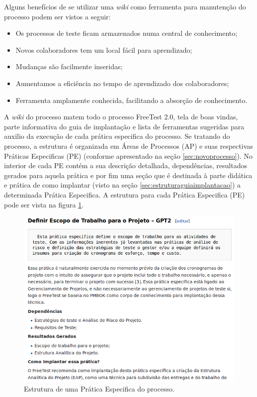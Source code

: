 Alguns benefícios de se utilizar uma \textit{wiki} como ferramenta para manutenção do processo podem ser vistos a seguir:

\begin{itemize}
	\item Os processos de teste ficam armazenados numa central de conhecimento;
    \item Novos colaboradores tem um local fácil para aprendizado;
    \item Mudanças são facilmente inseridas;
    \item Aumentamos a eficiência no tempo de aprendizado dos colaboradores;
    \item Ferramenta amplamente conhecida, facilitando a absorção de conhecimento.
\end{itemize}

A \textit{wiki} do processo matem todo o processo FreeTest 2.0, tela de boas vindas, parte informativa do guia de implantação e lista de ferramentas sugeridas para auxilio da execução de cada prática especifica do processo. Se tratando do processo, a estrutura é organizada em Áreas de Processos (AP) e suas respectivas Práticas Especificas (PE) (conforme apresentado na seção \ref{sec:novoprocesso}). No interior de cada PE contém a sua descrição detalhada, dependências, resultados gerados para aquela prática e por fim uma seção que é destinada à parte didática e prática de como implantar (visto na seção \ref{sec:estruturaguiaimplantacao}) a determinada Prática Especifica. A estrutura para cada Prática Especifica (PE) pode ser vista na figura \ref{fig:fig64}.

\begin{figure}[H]
\centering
\includegraphics[width=.90\textwidth]{fig/figura64.png}
\caption{Estrutura de uma Prática Especifica do processo.}
\label{fig:fig64}
\end{figure}

